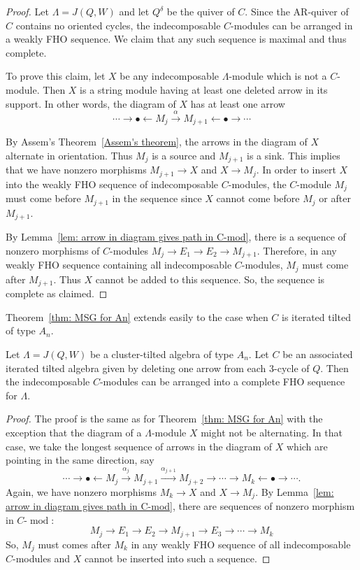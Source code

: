 \documentclass[ALCO,ThmDefs,Unicode,epreuves]{cedram}
\DeclareMathOperator{\modr}{mod}
\begin{document}
\begin{proof}
Let $\Lambda=J(Q,W)$ and let $Q^\delta$ be the quiver of $C$. Since the AR-quiver of $C$ contains no oriented cycles, the indecomposable $C$-modules can be arranged in a weakly FHO sequence. We claim that any such sequence is maximal and thus complete.

To prove this claim, let $X$ be any indecomposable $\Lambda$-module which is not a $C$-module. Then $X$ is a string module having at least one deleted arrow in its support. In other words, the diagram of $X$ has at least one arrow
\[
	\cdots \to\bullet\leftarrow M_j\xrightarrow\alpha M_{j+1}\leftarrow \bullet\to\cdots
\]

By Assem's Theorem~\ref{Assem's theorem}, the arrows in the diagram of $X$ alternate in orientation. Thus $M_j$ is a source and $M_{j+1}$ is a sink. This implies that we have nonzero morphisms $M_{j+1}\to X$ and $X\to M_j$. In order to insert $X$ into the weakly FHO sequence of indecomposable $C$-modules, the $C$-module $M_j$ must come before $M_{j+1}$ in the sequence since $X$ cannot come before $M_j$ or after $M_{j+1}$.



By Lemma~\ref{lem: arrow in diagram gives path in C-mod}, there is a sequence of nonzero morphisms of $C$-modules $M_j\to E_1\to E_2\to M_{j+1}$. Therefore, in any weakly FHO sequence containing all indecomposable $C$-modules, $M_j$ must come after $M_{j+1}$. Thus $X$ cannot be added to this sequence. So, the sequence is complete as claimed.
\end{proof}


Theorem~\ref{thm: MSG for An} extends easily to the case when $C$ is iterated tilted of type $A_n$.

\begin{coro}\label{MSG for iterated tilted}
Let $\Lambda=J(Q,W)$ be a cluster-tilted algebra of type $A_n$. Let $C$ be an associated iterated tilted algebra given by deleting one arrow from each 3-cycle of $Q$. Then the indecomposable $C$-modules can be arranged into a complete FHO sequence for $\Lambda$.
\end{coro}

\begin{proof}
The proof is the same as for Theorem~\ref{thm: MSG for An} with the exception that the diagram of a $\Lambda$-module $X$ might not be alternating. In that case, we take the longest sequence of arrows in the diagram of $X$ which are pointing in the same direction, say
\[
	\cdots \to\bullet\leftarrow M_j\xrightarrow{\alpha_j}M_{j+1}\xrightarrow{\alpha_{j+1}}M_{j+2}\rightarrow\cdots\rightarrow M_k\leftarrow \bullet\to\cdots.
\]
Again, we have nonzero morphisms $M_k\to X$ and $X\to M_j$. By Lemma~\ref{lem: arrow in diagram gives path in C-mod}, there are sequences of nonzero morphism in $C\text{-}\modr $:
\[
	M_j\to E_1\to E_2\to M_{j+1}\to E_3\to \cdots \to M_k
\]
So, $M_j$ must comes after $M_k$ in any weakly FHO sequence of all indecomposable $C$-modules and $X$ cannot be inserted into such a sequence.
\end{proof}
\end{document}
